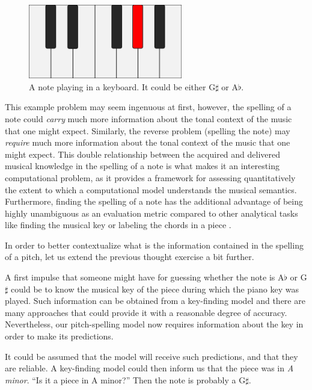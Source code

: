 \begin{figure}[h]
    \centering
    \includegraphics[width=0.6\textwidth]{figures/Q7_1.png}
    \caption{A note playing in a keyboard. It could be either G$\sharp$ or A$\flat$.}
    \label{fig:Q7_1}
\end{figure}

This example problem may seem ingenuous at first, however, the spelling of a note could \emph{carry} much more information about the tonal context of the music that one might expect. Similarly, the reverse problem (spelling the note) may \emph{require} much more information about the tonal context of the music that one might expect. This double relationship between the acquired and delivered musical knowledge in the spelling of a note is what makes it an interesting computational problem, as it provides a framework for assessing quantitatively the extent to which a computational model understands the musical semantics. Furthermore, finding the spelling of a note has the additional advantage of being highly unambiguous as an evaluation metric compared to other analytical tasks like finding the musical key \cite{gebhardt2018confidence} or labeling the chords in a piece \cite{ni2013understanding}.

In order to better contextualize what is the information contained in the spelling of a pitch, let us extend the previous thought exercise a bit further. 

A first impulse that someone might have for guessing whether the note is A$\flat$ or G$\sharp$ could be to know the musical key of the piece during which the piano key was played. Such information can be obtained from a key-finding model and there are many approaches that could provide it with a reasonable degree of accuracy. Nevertheless, our pitch-spelling model now requires information about the key in order to make its predictions. 

It could be assumed that the model will receive such predictions, and that they are reliable. A key-finding model could then inform us that the piece was in \emph{A minor}. ``Is it a piece in A minor?'' Then the note is probably a G$\sharp$.

